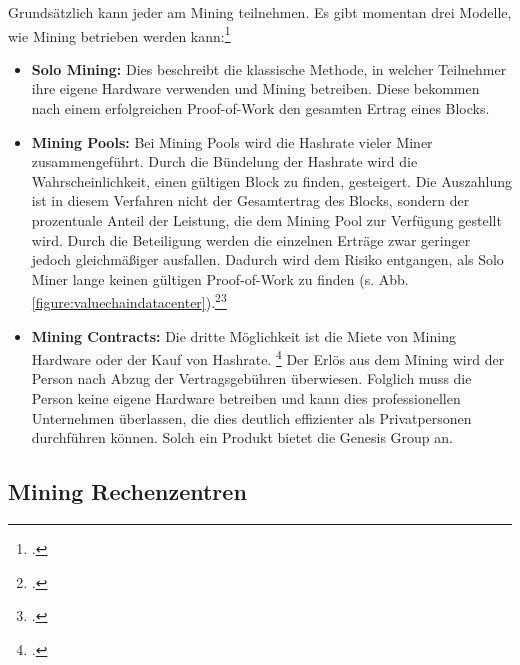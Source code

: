 Grundsätzlich kann jeder am Mining teilnehmen. Es gibt momentan drei Modelle, wie Mining betrieben werden
kann:\footcite[Vgl.][S. 53, S. 57ff]{bhaskar2015bitcoin}
\begin{itemize}
    \item \textbf{Solo Mining: }Dies beschreibt die klassische Methode, in welcher Teilnehmer ihre eigene Hardware
    verwenden und Mining betreiben. Diese bekommen nach einem erfolgreichen Proof-of-Work den gesamten Ertrag eines Blocks.
    \item \textbf{Mining Pools: }Bei Mining Pools wird die Hashrate vieler Miner zusammengeführt. Durch die Bündelung
    der Hashrate wird die Wahrscheinlichkeit, einen gültigen Block zu finden, gesteigert. Die Auszahlung ist in diesem
    Verfahren nicht der Gesamtertrag des Blocks, sondern der prozentuale Anteil der Leistung, die dem Mining Pool zur
    Verfügung gestellt wird. Durch die Beteiligung werden die einzelnen Erträge zwar geringer jedoch gleichmäßiger
    ausfallen. Dadurch wird dem Risiko entgangen, als Solo Miner lange keinen gültigen Proof-of-Work zu finden
    (s. Abb. \ref{figure:valuechaindatacenter}).\footcite[Vgl.][S. 58ff]{bhaskar2015bitcoin}\footcite[Vgl.][S. 327]{derks2018chaining}
    \item \textbf{Mining Contracts: }Die dritte Möglichkeit ist die Miete von Mining Hardware oder der Kauf von
    Hashrate. \footcite[Vgl.][S. 58ff]{bhaskar2015bitcoin} Der Erlös aus dem Mining wird der Person nach Abzug der
    Vertragsgebühren überwiesen. Folglich muss die Person keine eigene Hardware betreiben und kann dies professionellen
    Unternehmen überlassen, die dies deutlich effizienter als Privatpersonen durchführen können. Solch ein Produkt bietet die
    Genesis Group an.
\end{itemize}

\subsection{Mining Rechenzentren} \label{toc:miningrechenzentren}

